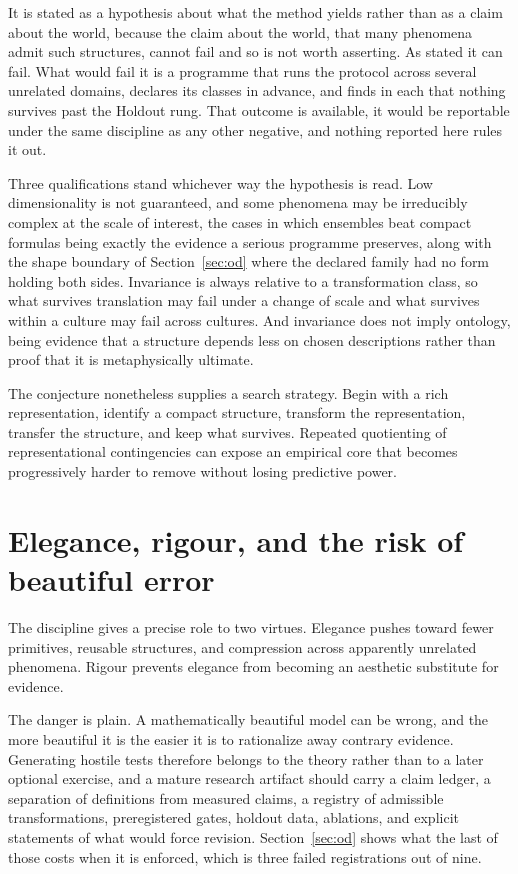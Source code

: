 \documentclass[11pt]{article}
\theoremstyle{remark}
\begin{document}
It is stated as a hypothesis about what the method yields rather than as a claim
about the world, because the claim about the world, that many phenomena admit such
structures, cannot fail and so is not worth asserting. As stated it can fail. What
would fail it is a programme that runs the protocol across several unrelated
domains, declares its classes in advance, and finds in each that nothing survives
past the Holdout rung. That outcome is available, it would be reportable under the
same discipline as any other negative, and nothing reported here rules it out.

Three qualifications stand whichever way the hypothesis is read. Low dimensionality is not guaranteed, and some phenomena may be
irreducibly complex at the scale of interest, the cases in which ensembles beat
compact formulas being exactly the evidence a serious programme preserves, along
with the shape boundary of Section~\ref{sec:od} where the declared family had no
form holding both sides. Invariance is always relative to a transformation class, so
what survives translation may fail under a change of scale and what survives within
a culture may fail across cultures. And invariance does not imply ontology, being
evidence that a structure depends less on chosen descriptions rather than proof that
it is metaphysically ultimate.

The conjecture nonetheless supplies a search strategy. Begin with a rich
representation, identify a compact structure, transform the representation, transfer
the structure, and keep what survives. Repeated quotienting of representational
contingencies can expose an empirical core that becomes progressively harder to
remove without losing predictive power.

\section{Elegance, rigour, and the risk of beautiful error}

The discipline gives a precise role to two virtues. Elegance pushes toward fewer
primitives, reusable structures, and compression across apparently unrelated
phenomena. Rigour prevents elegance from becoming an aesthetic substitute for
evidence.

The danger is plain. A mathematically beautiful model can be wrong, and the more
beautiful it is the easier it is to rationalize away contrary evidence. Generating
hostile tests therefore belongs to the theory rather than to a later optional
exercise, and a mature research artifact should carry a claim ledger, a separation
of definitions from measured claims, a registry of admissible transformations,
preregistered gates, holdout data, ablations, and explicit statements of what would
force revision. Section~\ref{sec:od} shows what the last of those costs when it is
enforced, which is three failed registrations out of nine.
\end{document}
